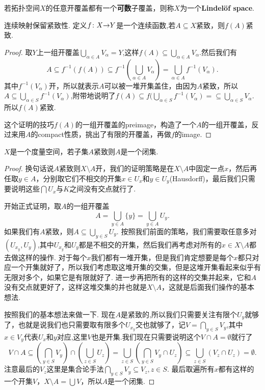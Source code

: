 \begin{definition}
若拓扑空间$X$的任意开覆盖都有一个\textbf{可数}子覆盖，则称$X$为一个\rm \textbf{Lindelöf space}.
\end{definition}

\begin{proposition}
连续映射保留紧致性. 定义${f}\colon{X}{\to}{Y}$是一个连续函数,若$A \subseteq X$紧致，则$f(A)$紧致.
\end{proposition}

\begin{proof}
取$Y$上一组开覆盖$\bigcup\limits_{\alpha \in A}V_\alpha=Y$,这样$f(A) \subseteq \bigcup\limits_{\alpha \in A}V_\alpha$.然后我们有\[A \subseteq f^{-1}(f(A)) \subseteq f^{-1}(\bigcup\limits_{\alpha \in A}V_\alpha) = \bigcup\limits_{\alpha \in A} f^{-1}(V_\alpha).\]其中$f^{-1}(V_\alpha)$开，所以就表示$A$可以被一堆开集盖住，由因为$A$紧致，所以$A \subseteq \bigcup\limits_{\alpha \in S} f^{-1}(V_\alpha)$,附带地说明了$f(A) \subseteq f(\bigcup\limits_{\alpha \in S} f^{-1}(V_\alpha) = \subseteq \bigcup\limits_{\alpha \in S} V_\alpha $.所以$f(A)$紧致.

这个证明的技巧$f(A)$的一组开覆盖的preimage，构造了一个$A$的一组开覆盖，反过来用$A$的compact性质，挑出了有限的开覆盖，再做$f$的image.
\end{proof}



\begin{example}
$X$是一个度量空间，若子集$A$紧致则$A$是一个闭集.
\end{example}

\begin{proof}
换句话说$A$紧致则$X \setminus A$开，我们的证明策略是在$X \setminus A$中固定一点$x$，然后再任取$y \in A$，分别取它们不相交的开集$x \in U_x$和$y \in U_y$(Hausdorff)，最后我们只需要说明这些$\bigcap U_x$与$K$之间没有交点就行了.

开始正式证明，取$A$的一组开覆盖\[A = \bigcup\limits_{y \in A} \{y\} = \bigcup\limits_{y \in A}U_y.\]如果我们有$A$紧致，则$A \subseteq \bigcup\limits_{y \in S} U_y$. 按照我们前面的策略，我们需要取任意多对$(U_{x_y},U_y)$,其中$U_{x_y}$和$U_y$都是不相交的开集，然后我们再考虑对所有的$x \in X \setminus A$都去做这样的操作. 对于每个$x$我们都有一堆开集，但是我们肯定想要是每个$x$都只对应一个开集就好了，所以我们考虑取这堆开集的交集，但是这堆开集看起来似乎有无限对多个，如果它是有限就好了. 进一步再把所有的这样的交集并起来，它和$A$没有交点就更好了，这样这堆交集的并也就是$X \setminus A$，这就是后面我们操作的基本想法.

按照我们的基本想法来做一下. 现在$A$是紧致的,所以我们只需要关注有限个$U_y$就够了，也就是说我们也只需要取有限多个$U_{x_y}$交也就够了，记$V = \bigcap\limits_{y \in S} V_y$,其中$x \in V_y$代表$U_x$和$y$对应,这里$V$也是开集.我们现在只需要说明这个$V \cap A = \emptyset$就行了\[V \cap A \subseteq \left( \bigcap\limits_{y \in S} V_y \right) \cap \left(\bigcup\limits_{z \in S} U_z \right) = \bigcup\limits_{z \in S}\left(\bigcap\limits_{y \in S} V_y \cap U_z \right) \subseteq \bigcup\limits_{z \in S}(V_z \cap U_z) = \emptyset. \]注意最后的$V_z$这里是集合论手法$\bigcap\limits_{y \in S} V_y \subseteq V_z, z \in S$. 最后取遍所有$x$都有这样的一个开集$V$，$X \setminus A = \bigcup V$，所以$A$是一个闭集.
\end{proof}

